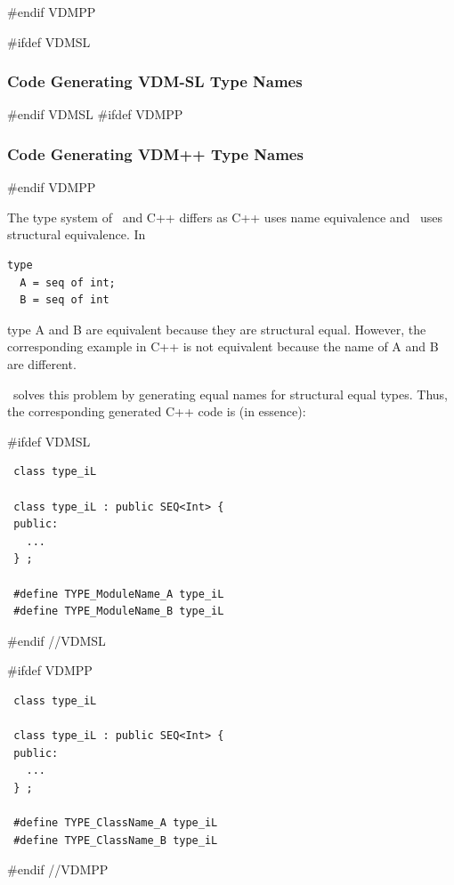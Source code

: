 \documentclass[\pformat,12pt]{article}
\begin{document}
\begin{itemize}
%
%
%
#endif VDMPP

\end{itemize}

#ifdef VDMSL
\subsubsection{Code Generating VDM-SL Type Names}\label{nameconventions}
#endif VDMSL
#ifdef VDMPP
\subsubsection{Code Generating VDM++ Type Names}\label{nameconventions}
#endif VDMPP

The type system of \VDM\ and C++ differs as C++ uses name equivalence
and \VDM\ uses structural equivalence. In \VDM\
\begin{verbatim}
type                            
  A = seq of int;              
  B = seq of int
\end{verbatim}
type A and B are equivalent because they are
structural equal. However, the corresponding example in C++ is not
equivalent because the name of A and B are different.

\Tcg\ solves this problem by generating equal names for
structural equal types.
Thus, the corresponding generated C++ code is (in essence):

#ifdef VDMSL
\begin{verbatim}
 class type_iL

 class type_iL : public SEQ<Int> {
 public:
   ...
 } ;

 #define TYPE_ModuleName_A type_iL
 #define TYPE_ModuleName_B type_iL
\end{verbatim}
#endif //VDMSL

#ifdef VDMPP
\begin{verbatim}
 class type_iL

 class type_iL : public SEQ<Int> {
 public:
   ...
 } ;

 #define TYPE_ClassName_A type_iL
 #define TYPE_ClassName_B type_iL
\end{verbatim}
#endif //VDMPP
\end{document}
